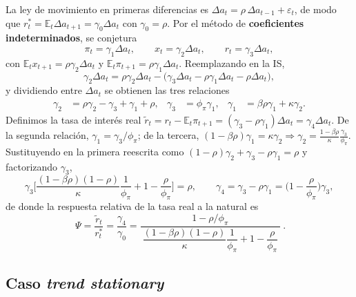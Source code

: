 \documentclass[11pt]{article}
\renewcommand{\boxed}[1]{#1}     %
\theoremstyle{definition}
\newcommand{\E}{\mathbb{E}}
\begin{document}
La ley de movimiento en primeras diferencias es $\Delta a_{t}=\rho\,\Delta a_{t-1}+\varepsilon_{t}$, de
modo que $r_{t}^{\ast}=\E_{t}\Delta a_{t+1}=\gamma_{0}\Delta a_{t}$ con $\gamma_{0}=\rho$. Por el método
de \textbf{coeficientes indeterminados}, se conjetura
\begin{equation}
\pi_{t}=\gamma_{1}\Delta a_{t},\qquad x_{t}=\gamma_{2}\Delta a_{t},\qquad r_{t}=\gamma_{3}\Delta a_{t},
\end{equation}
con $\E_{t}x_{t+1}=\rho\gamma_{2}\Delta a_{t}$ y $\E_{t}\pi_{t+1}=\rho\gamma_{1}\Delta a_{t}$.
Reemplazando en la IS,
\begin{equation}
\gamma_{2}\Delta a_{t}=\rho\gamma_{2}\Delta a_{t}-\big(\gamma_{3}\Delta a_{t}-\rho\gamma_{1}\Delta a_{t}-\rho\Delta a_{t}\big),
\end{equation}
y dividiendo entre $\Delta a_{t}$ se obtienen las tres relaciones
\begin{align}
\gamma_{2}&=\rho\gamma_{2}-\gamma_{3}+\gamma_{1}+\rho, &
\gamma_{3}&=\phi_{\pi}\gamma_{1}, &
\gamma_{1}&=\beta\rho\gamma_{1}+\kappa\gamma_{2} .
\end{align}
Definimos la tasa de interés real $\widetilde{r}_{t}=r_{t}-\E_{t}\pi_{t+1}=(\gamma_{3}-\rho\gamma_{1})\Delta a_{t}=\gamma_{4}\Delta a_{t}$.
De la segunda relación, $\gamma_{1}=\gamma_{3}/\phi_{\pi}$; de la tercera,
$(1-\beta\rho)\gamma_{1}=\kappa\gamma_{2}\Rightarrow\gamma_{2}=\tfrac{1-\beta\rho}{\kappa}\tfrac{\gamma_{3}}{\phi_{\pi}}$.
Sustituyendo en la primera reescrita como $(1-\rho)\gamma_{2}+\gamma_{3}-\rho\gamma_{1}=\rho$ y
factorizando $\gamma_{3}$,
\begin{equation}
\gamma_{3}\Big[\frac{(1-\beta\rho)(1-\rho)}{\kappa}\frac{1}{\phi_{\pi}}+1-\frac{\rho}{\phi_{\pi}}\Big]=\rho,
\qquad
\gamma_{4}=\gamma_{3}-\rho\gamma_{1}=\Big(1-\frac{\rho}{\phi_{\pi}}\Big)\gamma_{3},
\end{equation}
de donde la respuesta relativa de la tasa real a la natural es
\begin{equation}
\boxed{\ \Psi=\frac{\widetilde{r}_{t}}{r_{t}^{\ast}}=\frac{\gamma_{4}}{\gamma_{0}}
=\frac{1-\rho/\phi_{\pi}}{\ \dfrac{(1-\beta\rho)(1-\rho)}{\kappa}\dfrac{1}{\phi_{\pi}}+1-\dfrac{\rho}{\phi_{\pi}}\ }\ }.
\end{equation}

\subsection{Caso \emph{trend stationary}}
\end{document}

